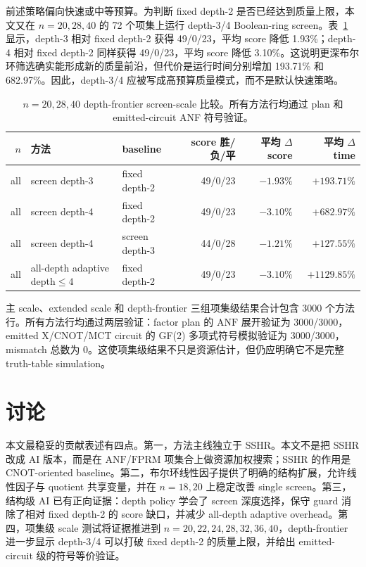 \documentclass[UTF8,fontset=macnew,11pt]{ctexart}
\newcommand{\screen}{Boolean-ring screen}
\newcommand{\anf}{\ensuremath{\mathrm{ANF}}}
\newcommand{\fprm}{\ensuremath{\mathrm{FPRM}}}
\newcommand{\ttable}{truth-table}
\begin{document}
前述策略偏向快速或中等预算。为判断 fixed depth-2 是否已经达到质量上限，本文又在 $n=20,28,40$ 的 72 个项集上运行 depth-3/4 \screen{}。表~\ref{tab:depth-frontier} 显示，depth-3 相对 fixed depth-2 获得 49/0/23，平均 score 降低 1.93\%；depth-4 相对 fixed depth-2 同样获得 49/0/23，平均 score 降低 3.10\%。这说明更深布尔环筛选确实能形成新的质量前沿，但代价是运行时间分别增加 193.71\% 和 682.97\%。因此，depth-3/4 应被写成高预算质量模式，而不是默认快速策略。

\begin{table}[htbp]
\centering
\scriptsize
\caption{$n=20,28,40$ depth-frontier screen-scale 比较。所有方法行均通过 plan 和 emitted-circuit ANF 符号验证。}
\label{tab:depth-frontier}
\begin{tabular}{rllrrr}
\toprule
$n$ & 方法 & baseline & score 胜/负/平 & 平均 $\Delta$ score & 平均 $\Delta$ time \\
\midrule
all & screen depth-3 & fixed depth-2 & 49/0/23 & $-1.93\%$ & $+193.71\%$ \\
all & screen depth-4 & fixed depth-2 & 49/0/23 & $-3.10\%$ & $+682.97\%$ \\
all & screen depth-4 & screen depth-3 & 44/0/28 & $-1.21\%$ & $+127.55\%$ \\
all & all-depth adaptive depth$\leq4$ & fixed depth-2 & 49/0/23 & $-3.10\%$ & $+1129.85\%$ \\
\bottomrule
\end{tabular}
\end{table}

主 scale、extended scale 和 depth-frontier 三组项集级结果合计包含 3000 个方法行。所有方法行均通过两层验证：factor plan 的 \anf{} 展开验证为 3000/3000，emitted X/CNOT/MCT circuit 的 GF(2) 多项式符号模拟验证为 3000/3000，mismatch 总数为 0。这使项集级结果不只是资源估计，但仍应明确它不是完整 \ttable{} simulation。

\section{讨论}

本文最稳妥的贡献表述有四点。第一，方法主线独立于 SSHR。本文不是把 SSHR 改成 AI 版本，而是在 \anf{}/\fprm{} 项集合上做资源加权搜索；SSHR 的作用是 CNOT-oriented baseline。第二，布尔环线性因子提供了明确的结构扩展，允许线性因子与 quotient 共享变量，并在 $n=18,20$ 上稳定改善 single screen。第三，结构级 AI 已有正向证据：depth policy 学会了 screen 深度选择，保守 guard 消除了相对 fixed depth-2 的 score 缺口，并减少 all-depth adaptive overhead。第四，项集级 scale 测试将证据推进到 $n=20,22,24,28,32,36,40$，depth-frontier 进一步显示 depth-3/4 可以打破 fixed depth-2 的质量上限，并给出 emitted-circuit 级的符号等价验证。
\end{document}
